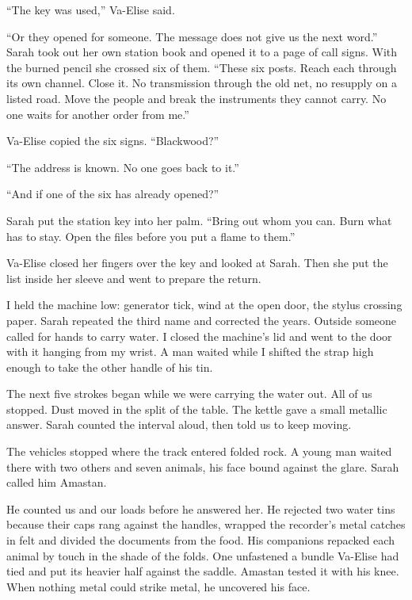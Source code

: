 ``The key was used,'' Va-Elise said.\par

``Or they opened for someone. The message does not give us the next word.'' Sarah took out her own station book and opened it to a page of call signs. With the burned pencil she crossed six of them. ``These six posts. Reach each through its own channel. Close it. No transmission through the old net, no resupply on a listed road. Move the people and break the instruments they cannot carry. No one waits for another order from me.''\par

Va-Elise copied the six signs. ``Blackwood?''\par

``The address is known. No one goes back to it.''\par

``And if one of the six has already opened?''\par

Sarah put the station key into her palm. ``Bring out whom you can. Burn what has to stay. Open the files before you put a flame to them.''\par

Va-Elise closed her fingers over the key and looked at Sarah. Then she put the list inside her sleeve and went to prepare the return.\par

I held the machine low: generator tick, wind at the open door, the stylus crossing paper. Sarah repeated the third name and corrected the years. Outside someone called for hands to carry water. I closed the machine's lid and went to the door with it hanging from my wrist. A man waited while I shifted the strap high enough to take the other handle of his tin.\par

The next five strokes began while we were carrying the water out. All of us stopped. Dust moved in the split of the table. The kettle gave a small metallic answer. Sarah counted the interval aloud, then told us to keep moving.\par

\ornament

The vehicles stopped where the track entered folded rock. A young man waited there with two others and seven animals, his face bound against the glare. Sarah called him Amastan.\par

He counted us and our loads before he answered her. He rejected two water tins because their caps rang against the handles, wrapped the recorder's metal catches in felt and divided the documents from the food. His companions repacked each animal by touch in the shade of the folds. One unfastened a bundle Va-Elise had tied and put its heavier half against the saddle. Amastan tested it with his knee. When nothing metal could strike metal, he uncovered his face.\par

